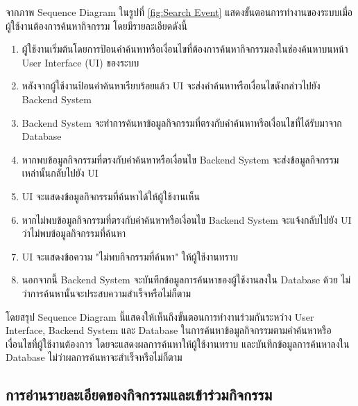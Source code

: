 \documentclass[14pt,oneside,openright,a4paper]{cpe-thai-project}
\begin{document}
  จากภาพ Sequence Diagram ในรูปที่ \ref{fig:Search Event} แสดงขั้นตอนการทำงานของระบบเมื่อผู้ใช้งานต้องการค้นหากิจกรรม โดยมีรายละเอียดดังนี้
  \begin{enumerate}
    \item ผู้ใช้งานเริ่มต้นโดยการป้อนคำค้นหาหรือเงื่อนไขที่ต้องการค้นหากิจกรรมลงในช่องค้นหาบนหน้า User Interface (UI) ของระบบ
    \item หลังจากผู้ใช้งานป้อนคำค้นหาเรียบร้อยแล้ว UI จะส่งคำค้นหาหรือเงื่อนไขดังกล่าวไปยัง Backend System
    \item Backend System จะทำการค้นหาข้อมูลกิจกรรมที่ตรงกับคำค้นหาหรือเงื่อนไขที่ได้รับมาจาก Database
    \item หากพบข้อมูลกิจกรรมที่ตรงกับคำค้นหาหรือเงื่อนไข Backend System จะส่งข้อมูลกิจกรรมเหล่านั้นกลับไปยัง UI
    \item UI จะแสดงข้อมูลกิจกรรมที่ค้นหาได้ให้ผู้ใช้งานเห็น
    \item หากไม่พบข้อมูลกิจกรรมที่ตรงกับคำค้นหาหรือเงื่อนไข Backend System จะแจ้งกลับไปยัง UI ว่าไม่พบข้อมูลกิจกรรมที่ค้นหา
    \item UI จะแสดงข้อความ "ไม่พบกิจกรรมที่ค้นหา" ให้ผู้ใช้งานทราบ
    \item นอกจากนี้ Backend System จะบันทึกข้อมูลการค้นหาของผู้ใช้งานลงใน Database ด้วย ไม่ว่าการค้นหานั้นจะประสบความสำเร็จหรือไม่ก็ตาม
  \end{enumerate}
  โดยสรุป Sequence Diagram นี้แสดงให้เห็นถึงขั้นตอนการทำงานร่วมกันระหว่าง User Interface, Backend System และ Database ในการค้นหาข้อมูลกิจกรรมตามคำค้นหาหรือเงื่อนไขที่ผู้ใช้งานต้องการ โดยจะแสดงผลการค้นหาให้ผู้ใช้งานทราบ และบันทึกข้อมูลการค้นหาลงใน Database ไม่ว่าผลการค้นหาจะสำเร็จหรือไม่ก็ตาม

  \newpage

\subsection{การอ่านรายละเอียดของกิจกรรมและเข้าร่วมกิจกรรม}
\end{document}

